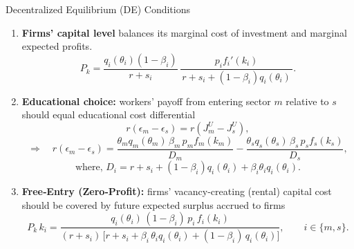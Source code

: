 \documentclass[9pt,xcolor={svgnames}]{beamer}
\begin{document}
\begin{frame}{Decentralized Equilibrium (DE) Conditions}
  \begin{enumerate}

\item \textbf{Firms' capital level}  balances its marginal cost of investment and marginal expected profits.
\[
   P_k  = \frac{q_i(\theta_i)(1-\beta_i)}{r+s_i}\,\frac{p_i  f_i'(k_i)}{\,r+s_i+(1-\beta_i)q_i(\theta_i)\,}.
\]

 \item \textbf{Educational choice:} workers' payoff from entering sector $m$ relative to $s$ should equal educational cost differential
      \[
      r(\epsilon_m - \epsilon_s) = r(J^U_m - J^U_s),
      \]
      \[
        \Longrightarrow\quad
        r(\epsilon_m - \epsilon_s)
=
\frac{ \theta_m q_m(\theta_m)\,\beta_m\, p_m f_m(k_m) }
     { \,D_m \, }
-
\frac{ \theta_s q_s(\theta_s)\,\beta_s\, p_s f_s(k_s) }
     { \,D_s \, },
      \]
$$\text{where, }D_i = r+s_i + (1-\beta_i) q_i(\theta_i) + \beta_i \theta_i q_i(\theta_i).$$
    \item \textbf{Free‐Entry (Zero‐Profit):} firms' vacancy-creating (rental) capital cost should be covered by future expected surplus accrued to firms
      \[
     P_{k}\,k_i
= \frac{q_i(\theta_i)\,(1-\beta_i)\,p_i\,f_i(k_i)}
       {(r+s_i)\,\bigl[r+s_i + \beta_i\,\theta_i q_i(\theta_i) + (1-\beta_i)\,q_i(\theta_i)\bigr]},
\qquad i \in \{m,s\}.
      \]
  \end{enumerate}
\end{frame}
\end{document}
